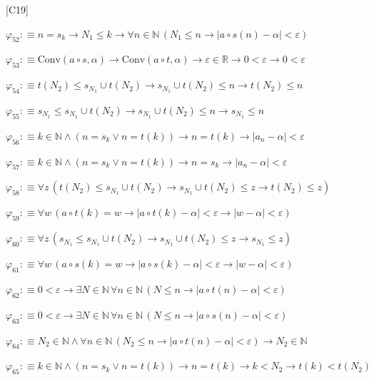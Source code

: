 \begin{fullproof}{[C19]}
\begin{abbrevlist}
\item $\varphi_{52} :\equiv n = s_{k} \to N_{1} \leq k \to \forall n \in \mathbb{N}\,(N_{1} \leq n \to \lvert a \circ s(n) - \alpha \rvert < \varepsilon)$
\item $\varphi_{53} :\equiv \mathrm{Conv}(a \circ s,\alpha) \to \mathrm{Conv}(a \circ t,\alpha) \to \varepsilon \in \mathbb{R} \to 0 < \varepsilon \to 0 < \varepsilon$
\item $\varphi_{54} :\equiv t(N_{2}) \leq s_{N_{1}} \cup t(N_{2}) \to s_{N_{1}} \cup t(N_{2}) \leq n \to t(N_{2}) \leq n$
\item $\varphi_{55} :\equiv s_{N_{1}} \leq s_{N_{1}} \cup t(N_{2}) \to s_{N_{1}} \cup t(N_{2}) \leq n \to s_{N_{1}} \leq n$
\item $\varphi_{56} :\equiv k \in \mathbb{N} \land (n = s_{k} \lor n = t(k)) \to n = t(k) \to \lvert a_{n} - \alpha \rvert < \varepsilon$
\item $\varphi_{57} :\equiv k \in \mathbb{N} \land (n = s_{k} \lor n = t(k)) \to n = s_{k} \to \lvert a_{n} - \alpha \rvert < \varepsilon$
\item $\varphi_{58} :\equiv \forall z\,(t(N_{2}) \leq s_{N_{1}} \cup t(N_{2}) \to s_{N_{1}} \cup t(N_{2}) \leq z \to t(N_{2}) \leq z)$
\item $\varphi_{59} :\equiv \forall w\,(a \circ t(k) = w \to \lvert a \circ t(k) - \alpha \rvert < \varepsilon \to \lvert w - \alpha \rvert < \varepsilon)$
\item $\varphi_{60} :\equiv \forall z\,(s_{N_{1}} \leq s_{N_{1}} \cup t(N_{2}) \to s_{N_{1}} \cup t(N_{2}) \leq z \to s_{N_{1}} \leq z)$
\item $\varphi_{61} :\equiv \forall w\,(a \circ s(k) = w \to \lvert a \circ s(k) - \alpha \rvert < \varepsilon \to \lvert w - \alpha \rvert < \varepsilon)$
\item $\varphi_{62} :\equiv 0 < \varepsilon \to \exists N \in \mathbb{N}\,\forall n \in \mathbb{N}\,(N \leq n \to \lvert a \circ t(n) - \alpha \rvert < \varepsilon)$
\item $\varphi_{63} :\equiv 0 < \varepsilon \to \exists N \in \mathbb{N}\,\forall n \in \mathbb{N}\,(N \leq n \to \lvert a \circ s(n) - \alpha \rvert < \varepsilon)$
\item $\varphi_{64} :\equiv N_{2} \in \mathbb{N} \land \forall n \in \mathbb{N}\,(N_{2} \leq n \to \lvert a \circ t(n) - \alpha \rvert < \varepsilon) \to N_{2} \in \mathbb{N}$
\item $\varphi_{65} :\equiv k \in \mathbb{N} \land (n = s_{k} \lor n = t(k)) \to n = t(k) \to k < N_{2} \to t(k) < t(N_{2})$

\end{abbrevlist}
\end{fullproof}
